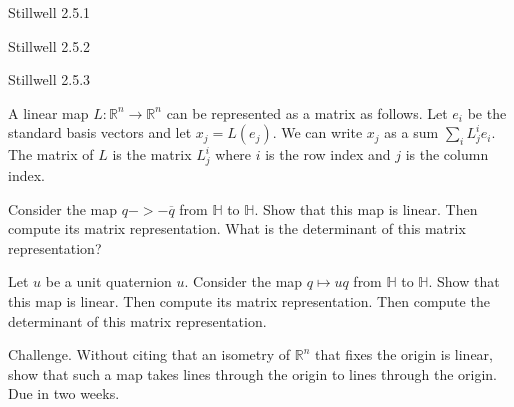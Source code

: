 \documentclass[minion]{homework}
\newcommand{\Reals}{\mathbb{R}}
\newcommand{\Quats}{\mathbb{H}}
\begin{document}
\begin{problems}
\problem Stillwell 2.5.1

\problem Stillwell 2.5.2

\problem Stillwell 2.5.3

\problem A linear map $L:\Reals^n\to\Reals^n$ can be represented
as a matrix as follows.  Let $e_i$ be the standard basis vectors
and let $x_j = L(e_j)$.  We can write $x_j$ as a sum $\sum_i L_j^i e_i$.
The matrix of $L$ is the matrix $L^i_j$ where $i$ is the row index and $j$
is the column index.  

\begin{subproblems}
\item Consider the map $q->-\overline{q}$ from $\Quats$ to $\Quats$.  
Show that this map is linear.  Then compute its matrix representation.
What is the determinant of this matrix representation?

\item Let $u$ be a unit quaternion $u$.  Consider the map $q\mapsto uq$
from $\Quats$ to $\Quats$.  Show that this map is linear.  Then compute its 
matrix representation.  Then compute the determinant of this matrix representation.

\problem Challenge. Without citing that an isometry of $\Reals^n$ that fixes
the origin is linear, show that such a map takes lines through the origin
to lines through the origin.  Due in two weeks.
\end{subproblems}
\end{problems}
\end{document}
